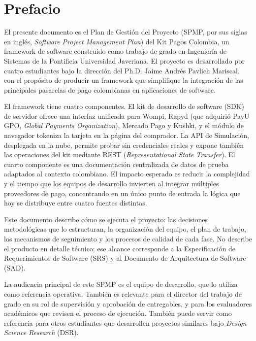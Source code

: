 \section*{Prefacio}

El presente documento es el Plan de Gestión del Proyecto (SPMP, por sus siglas en inglés, \textit{Software Project Management Plan}) del Kit Pagos Colombia, un framework de software construido como trabajo de grado en Ingeniería de Sistemas de la Pontificia Universidad Javeriana. El proyecto es desarrollado por cuatro estudiantes bajo la dirección del Ph.D. Jaime Andrés Pavlich Mariscal, con el propósito de producir un framework que simplifique la integración de las principales pasarelas de pago colombianas en aplicaciones de software.

El framework tiene cuatro componentes. El kit de desarrollo de software (SDK) de servidor ofrece una interfaz unificada para Wompi, Rapyd (que adquirió PayU GPO, \textit{Global Payments Organization}), Mercado Pago y Kushki, y el módulo de navegador tokeniza la tarjeta en la página del comprador. La API de Simulación, desplegada en la nube, permite probar sin credenciales reales y expone también las operaciones del kit mediante REST (\textit{Representational State Transfer}). El cuarto componente es una documentación centralizada de datos de prueba adaptados al contexto colombiano. El impacto esperado es reducir la complejidad y el tiempo que los equipos de desarrollo invierten al integrar múltiples proveedores de pago, concentrando en un único punto de entrada la lógica que hoy se distribuye entre cuatro fuentes distintas.

Este documento describe cómo se ejecuta el proyecto: las decisiones metodológicas que lo estructuran, la organización del equipo, el plan de trabajo, los mecanismos de seguimiento y los procesos de calidad de cada fase. No describe el producto en detalle técnico; ese alcance corresponde a la Especificación de Requerimientos de Software (SRS) y al Documento de Arquitectura de Software (SAD).

La audiencia principal de este SPMP es el equipo de desarrollo, que lo utiliza como referencia operativa. También es relevante para el director del trabajo de grado en su rol de supervisión y aprobación de entregables, y para los evaluadores académicos que revisen el proceso de ejecución. También puede servir como referencia para otros estudiantes que desarrollen proyectos similares bajo \textit{Design Science Research} (DSR).
